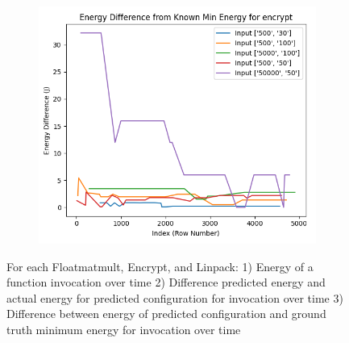 \documentclass[times, 10pt,twocolumn]{article}
\begin{document}
\begin{figure}[ht]
\begin{subfigure}[b]{0.22\textwidth}
     \caption{}
     \label{fig:encrypt_energy_diff}
   \end{subfigure}
   \hfill
   \begin{subfigure}[b]{0.22\textwidth}
      \includegraphics[width=\textwidth]{imgs/final_experiment_plots/model_analysis/measurement_data_analysis/encrypt_compare_min.png}
     \caption{}
     \label{fig:encrypt_compare_min}
   \end{subfigure}

   \caption{For each Floatmatmult, Encrypt, and Linpack: 1) Energy of a function invocation over time 2) Difference predicted energy and actual energy for predicted configuration for invocation over time 3) Difference between energy of predicted configuration and ground truth minimum energy for invocation over time}
   \label{fig:model_performance_measurement_study_}
\end{figure}
\end{document}
